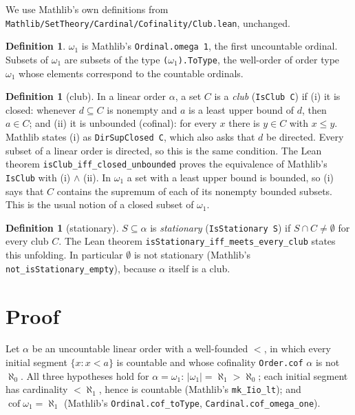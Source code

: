 \documentclass[11pt]{article}
\theoremstyle{definition}
\newtheorem{definition}[theorem]{Definition}
\theoremstyle{remark}
\begin{document}
We use Mathlib's own definitions from
\texttt{Mathlib/SetTheory/Cardinal/Cofinality/Club.lean}, unchanged.

\begin{definition}
$\omega_1$ is Mathlib's \texttt{Ordinal.omega 1}, the first uncountable ordinal. Subsets of
$\omega_1$ are subsets of the type \texttt{($\omega_1$).ToType}, the well-order of order type
$\omega_1$ whose elements correspond to the countable ordinals.
\end{definition}

\begin{definition}[club]
In a linear order $\alpha$, a set $C$ is a \emph{club} (\texttt{IsClub C}) if
(i) it is closed: whenever $d\subseteq C$ is nonempty and $a$ is a least upper bound of $d$,
then $a\in C$; and (ii) it is unbounded (cofinal): for every $x$ there is $y\in C$ with
$x\le y$. Mathlib states (i) as \texttt{DirSupClosed C}, which also asks that $d$ be directed.
Every subset of a linear order is directed, so this is the same condition. The Lean theorem
\texttt{isClub\_iff\_closed\_unbounded} proves the equivalence of Mathlib's \texttt{IsClub} with
(i) $\wedge$ (ii). In $\omega_1$ a set with a least upper bound is bounded, so (i) says that $C$
contains the supremum of each of its nonempty bounded subsets. This is the usual notion of a
closed subset of $\omega_1$.
\end{definition}

\begin{definition}[stationary]
$S\subseteq\alpha$ is \emph{stationary} (\texttt{IsStationary S}) if $S\cap C\ne\emptyset$ for
every club $C$. The Lean theorem \texttt{isStationary\_iff\_meets\_every\_club} states this
unfolding. In particular $\emptyset$ is not stationary (Mathlib's
\texttt{not\_isStationary\_empty}), because $\alpha$ itself is a club.
\end{definition}

\section{Proof}

Let $\alpha$ be an uncountable linear order with a well-founded $<$, in which every initial
segment $\{x : x < a\}$ is countable and whose cofinality \texttt{Order.cof} $\alpha$ is not
$\aleph_0$. All three hypotheses hold for $\alpha = \omega_1$:
$|\omega_1| = \aleph_1 > \aleph_0$; each initial segment has cardinality $<\aleph_1$, hence is
countable (Mathlib's \texttt{mk\_Iio\_lt}); and $\operatorname{cof}\omega_1 = \aleph_1$ (Mathlib's
\texttt{Ordinal.cof\_toType}, \texttt{Cardinal.cof\_omega\_one}).
\end{document}
